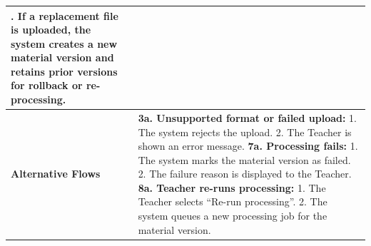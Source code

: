 \begin{longtable}{|>{\raggedright\arraybackslash}p{}|>{\raggedright\arraybackslash}p{}|}
8. If a replacement file is uploaded, the system creates a new material version and retains prior versions for rollback or re-processing. \\ \hline
\textbf{Alternative Flows} &
\textbf{3a. Unsupported format or failed upload:} \newline
\hspace*{1em}1. The system rejects the upload. \newline
\hspace*{1em}2. The Teacher is shown an error message. \newline
\textbf{7a. Processing fails:} \newline
\hspace*{1em}1. The system marks the material version as failed. \newline
\hspace*{1em}2. The failure reason is displayed to the Teacher. \newline
\textbf{8a. Teacher re-runs processing:} \newline
\hspace*{1em}1. The Teacher selects ``Re-run processing''. \newline
\hspace*{1em}2. The system queues a new processing job for the material version. \\
\end{longtable}

